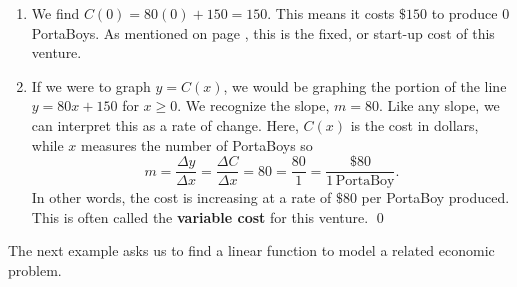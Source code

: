 \begin{ex}
\begin{enumerate}
\item  We find $C(0) = 80(0)+150 = 150$.  This means it costs $\$150$ to produce $0$ PortaBoys.  As mentioned on page \pageref{pricerevenuecostprofit}, this is the fixed, or start-up cost of this venture.

\item  If we were to graph $y = C(x)$, we would be graphing the portion of the line $y = 80x + 150$ for $x \geq 0$.  We recognize the slope, $m = 80$.  Like any slope, we can interpret this as a rate of change.  Here, $C(x)$ is the cost in dollars, while $x$ measures the number of PortaBoys so \[ m = \dfrac{\Delta y}{\Delta x} = \dfrac{\Delta C}{\Delta x} = 80 = \dfrac{80}{1} = \dfrac{\$ 80}{1 \, \mbox{PortaBoy}}.\] In other words,  the cost is increasing at a rate of $\$80$ per PortaBoy produced.  This is often called the \textbf{variable cost} for this venture.  \qed

\end{enumerate}

\end{ex}

The next example asks us to find a linear function to model a related economic problem.


